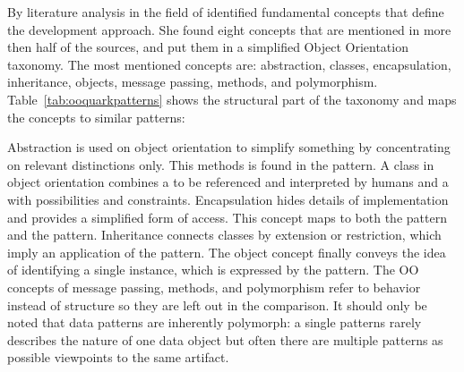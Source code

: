 By literature analysis in the field of 
\textcite{Armstrong2006} identified fundamental concepts that define the
 development approach. She found eight concepts that are
mentioned in more then half of the sources, and put them in a simplified Object
Orientation taxonomy. The most mentioned concepts are: abstraction, classes,
encapsulation, inheritance, objects, message passing, methods, and
polymorphism. Table~\ref{tab:ooquarkpatterns} shows the structural part of the
taxonomy and maps the  concepts to similar patterns:

Abstraction is used on object orientation to simplify something by
concentrating on relevant distinctions only. This methods is found in the
 pattern. A class in object orientation combines a
 to be referenced and interpreted by humans and a
 with possibilities and constraints. Encapsulation hides
details of implementation and provides a simplified form of access.  This
concept maps to both the  pattern and the
 pattern. Inheritance connects classes by extension or
restriction, which imply an application of the  pattern.
The object concept finally conveys the idea of identifying a single instance,
which is expressed by the  pattern.  The OO concepts of
message passing, methods, and polymorphism refer to behavior instead of
structure so they are left out in the comparison. It should only be noted that
data patterns are inherently polymorph: a single patterns rarely describes the
nature of one data object but often there are multiple patterns as possible
viewpoints to the same artifact.

